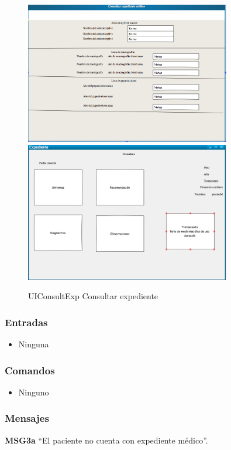 \begin{figure}[htbp!]
        \centering
        \includegraphics[width=0.8\textwidth]{images/UIEXP3}
            \includegraphics[width=0.8\textwidth]{images/UIEXP4}
        \caption{UIConsultExp Consultar expediente}
\end{figure}
\newpage
\subsubsection{Entradas}
\begin{itemize}
\item Ninguna
\end{itemize}

\subsubsection{Comandos}
\begin{itemize}
\item Ninguno
\end{itemize}

\subsubsection{Mensajes}
    \begin{Citemize}
        \item {\bf MSG3a} ``El paciente no cuenta con expediente médico''.
    \end{Citemize}







